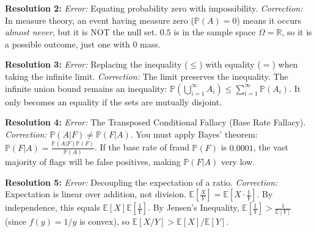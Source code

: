 \documentclass[11pt]{article}
\theoremstyle{definition}
\theoremstyle{remark}
\newcommand{\R}{\mathbb{R}}
\newcommand{\E}{\mathbb{E}}
\newcommand{\Prob}{\mathbb{P}}
\begin{document}
\textbf{Resolution 2:} \textit{Error:} Equating probability zero with impossibility. \textit{Correction:} In measure theory, an event having measure zero ($\Prob(A)=0$) means it occurs \textit{almost never}, but it is NOT the null set. $0.5$ is in the sample space $\Omega = \R$, so it is a possible outcome, just one with $0$ mass.

\textbf{Resolution 3:} \textit{Error:} Replacing the inequality ($\le$) with equality ($=$) when taking the infinite limit. \textit{Correction:} The limit preserves the inequality. The infinite union bound remains an inequality: $\Prob(\bigcup_{i=1}^\infty A_i) \le \sum_{i=1}^\infty \Prob(A_i)$. It only becomes an equality if the sets are mutually disjoint.

\textbf{Resolution 4:} \textit{Error:} The Transposed Conditional Fallacy (Base Rate Fallacy). \textit{Correction:} $\Prob(A|F) \neq \Prob(F|A)$. You must apply Bayes' theorem: $\Prob(F|A) = \frac{\Prob(A|F)\Prob(F)}{\Prob(A)}$. If the base rate of fraud $\Prob(F)$ is $0.0001$, the vast majority of flags will be false positives, making $\Prob(F|A)$ very low.

\textbf{Resolution 5:} \textit{Error:} Decoupling the expectation of a ratio. \textit{Correction:} Expectation is linear over addition, not division. $\E\left[\frac{X}{Y}\right] = \E\left[X \cdot \frac{1}{Y}\right]$. By independence, this equals $\E[X] \E\left[\frac{1}{Y}\right]$. By Jensen's Inequality, $\E\left[\frac{1}{Y}\right] > \frac{1}{\E[Y]}$ (since $f(y)=1/y$ is convex), so $\E[X/Y] > \E[X]/\E[Y]$.
\end{document}

